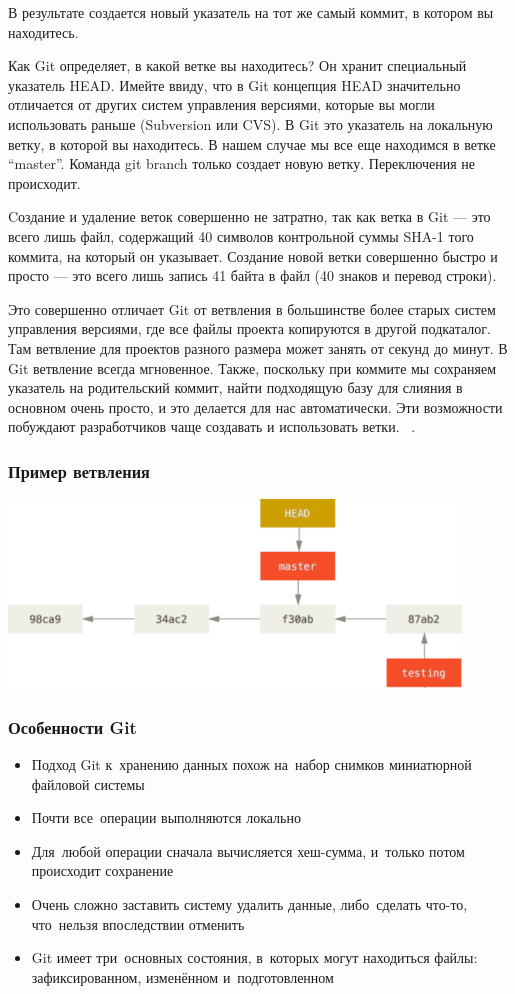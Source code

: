 \documentclass{../industrial-development}
\begin{document}
В результате создается новый указатель на тот же самый коммит, в котором вы находитесь.

Как Git определяет, в какой ветке вы находитесь? Он хранит специальный указатель HEAD. Имейте ввиду, что в Git концепция HEAD значительно отличается от других систем управления версиями, которые вы могли использовать раньше (Subversion или CVS). В Git это указатель на локальную ветку, в которой вы находитесь. В нашем случае мы все еще находимся в ветке “master”. Команда git branch только создает новую ветку. Переключения не происходит.

Cоздание и удаление веток совершенно не затратно, так как ветка в Git — это всего лишь файл, содержащий 40 символов контрольной суммы SHA-1 того коммита, на который он указывает. Создание новой ветки совершенно быстро и просто — это всего лишь запись 41 байта в файл (40 знаков и перевод строки).

Это совершенно отличает Git от ветвления в большинстве более старых систем управления версиями, где все файлы проекта копируются в другой подкаталог. Там ветвление для проектов разного размера может занять от секунд до минут. В Git ветвление всегда мгновенное. Также, поскольку при коммите мы сохраняем указатель на родительский коммит, найти подходящую базу для слияния в основном очень просто, и это делается для нас автоматически. Эти возможности побуждают разработчиков чаще создавать и использовать ветки.
~\cite[15-17]{ProGit}.

\begin{frame} \frametitle{Пример ветвления}
  \centerline{\includegraphics[width=0.9\textwidth]{branching-git.pdf}}
\end{frame}

\begin{frame} \frametitle{Особенности Git}
  \begin{itemize}
  \item Подход Git к~хранению данных похож на~набор снимков миниатюрной файловой системы
  \item Почти все~операции выполняются локально
  \item Для~любой операции сначала вычисляется хеш-сумма, и~только потом происходит сохранение
  \item Очень сложно заставить систему удалить данные, либо~сделать что-то, что~нельзя впоследствии отменить
  \item Git имеет три~основных состояния, в~которых могут находиться файлы: зафиксированном, изменённом и~подготовленном
  \end{itemize}
\end{frame}
\end{document}

